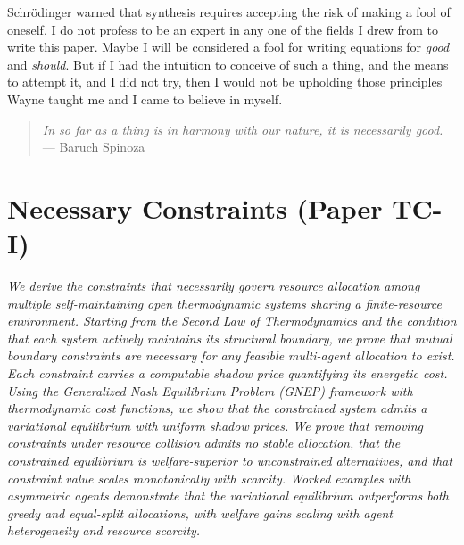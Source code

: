 \documentclass[11pt]{article}
\theoremstyle{plain}
\theoremstyle{definition}
\theoremstyle{remark}
\let\origsection\section
\renewcommand{\section}{\needspace{12\baselineskip}\origsection}
\begin{document}
Schrödinger warned that synthesis requires accepting the risk of making
a fool of oneself. I do not profess to be an expert in any one of the
fields I drew from to write this paper. Maybe I will be considered a
fool for writing equations for \emph{good} and \emph{should}. But if I
had the intuition to conceive of such a thing, and the means to attempt
it, and I did not try, then I would not be upholding those principles
Wayne taught me and I came to believe in myself.

\begin{quote}
\emph{In so far as a thing is in harmony with our nature, it is
necessarily good.} --- Baruch Spinoza \citep{Spinoza1677}
\end{quote}

\appendix
{}

\section{Necessary Constraints (Paper TC-I)}\label{app-I}

\emph{We derive the constraints that necessarily govern resource
allocation among multiple self-maintaining open thermodynamic systems
sharing a finite-resource environment. Starting from the Second Law of
Thermodynamics and the condition that each system actively maintains its
structural boundary, we prove that mutual boundary constraints are
necessary for any feasible multi-agent allocation to exist. Each
constraint carries a computable shadow price quantifying its energetic
cost. Using the Generalized Nash Equilibrium Problem (GNEP) framework
with thermodynamic cost functions, we show that the constrained system
admits a variational equilibrium with uniform shadow prices. We prove
that removing constraints under resource collision admits no stable
allocation, that the constrained equilibrium is welfare-superior to
unconstrained alternatives, and that constraint value scales
monotonically with scarcity. Worked examples with asymmetric agents
demonstrate that the variational equilibrium outperforms both greedy and
equal-split allocations, with welfare gains scaling with agent
heterogeneity and resource scarcity.}
\end{document}
